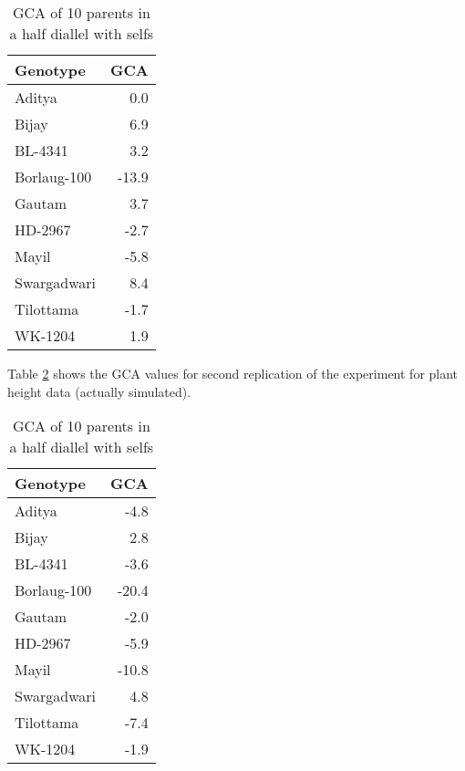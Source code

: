 \documentclass[nofonts,]{tufte-handout}
\begin{document}
\begin{table}

\caption{\label{tab:half-diallel-pht-gca}GCA of 10 parents in a half diallel with selfs}
\centering
\fontsize{8}{10}\selectfont
\begin{tabular}[t]{lr}
\toprule
Genotype & GCA\\
\midrule
\rowcolor{gray!6}  Aditya & 0.0\\
Bijay & 6.9\\
\rowcolor{gray!6}  BL-4341 & 3.2\\
Borlaug-100 & -13.9\\
\rowcolor{gray!6}  Gautam & 3.7\\
\addlinespace
HD-2967 & -2.7\\
\rowcolor{gray!6}  Mayil & -5.8\\
Swargadwari & 8.4\\
\rowcolor{gray!6}  Tilottama & -1.7\\
WK-1204 & 1.9\\
\bottomrule
\end{tabular}
\end{table}

Table \ref{tab:half-diallel-pht2-gca} shows the GCA values for second
replication of the experiment for plant height data (actually
simulated).

\begin{table}

\caption{\label{tab:half-diallel-pht2-gca}GCA of 10 parents in a half diallel with selfs}
\centering
\fontsize{8}{10}\selectfont
\begin{tabular}[t]{lr}
\toprule
Genotype & GCA\\
\midrule
\rowcolor{gray!6}  Aditya & -4.8\\
Bijay & 2.8\\
\rowcolor{gray!6}  BL-4341 & -3.6\\
Borlaug-100 & -20.4\\
\rowcolor{gray!6}  Gautam & -2.0\\
\addlinespace
HD-2967 & -5.9\\
\rowcolor{gray!6}  Mayil & -10.8\\
Swargadwari & 4.8\\
\rowcolor{gray!6}  Tilottama & -7.4\\
WK-1204 & -1.9\\
\bottomrule
\end{tabular}
\end{table}
\end{document}
